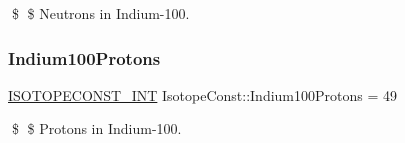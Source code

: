 \$ \$ Neutrons in Indium-\/100. \mbox{\label{group___isotope_const-_indium-_in100_gafabb6ad123c8ab5de8372a4845f248ef}} 
\subsubsection{\texorpdfstring{Indium100\+Protons}{Indium100Protons}}
{\footnotesize\ttfamily \mbox{\hyperlink{group___isotope_const-_macros_ga5f18360b3e99483a35c32d789e62621c}{I\+S\+O\+T\+O\+P\+E\+C\+O\+N\+S\+T\+\_\+\+I\+NT}} Isotope\+Const\+::\+Indium100\+Protons = 49}

\$ \$ Protons in Indium-\/100. 